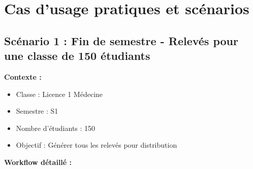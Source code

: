 \section{Cas d'usage pratiques et scénarios}

\subsection{Scénario 1 : Fin de semestre - Relevés pour une classe de 150 étudiants}

\textbf{Contexte :}
\begin{itemize}[leftmargin=*]
    \item Classe : Licence 1 Médecine
    \item Semestre : S1
    \item Nombre d'étudiants : 150
    \item Objectif : Générer tous les relevés pour distribution
\end{itemize}

\textbf{Workflow détaillé :}

